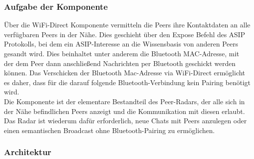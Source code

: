 \subsubsection{Aufgabe der Komponente}
Über die WiFi-Direct Komponente vermitteln die Peers ihre Kontaktdaten an alle ver\-füg\-ba\-ren Peers in der Nähe. Dies geschieht über den Expose Befehl des ASIP Protokolls, bei dem ein ASIP-Interesse an die Wissensbasis von anderen Peers gesandt wird. Dies beinhaltet unter anderem die Bluetooth MAC-Adresse, mit der dem Peer dann anschließend Nachrichten per Bluetooth geschickt werden können. Das Verschicken der Bluetooth Mac-Adresse via WiFi-Direct ermöglicht es daher, dass für die darauf folgende Bluetooth-Verbindung kein Pairing benötigt wird. 
\\Die Komponente ist der elementare Bestandteil des Peer-Radars, der alle sich in der Nähe befindlichen Peers anzeigt und die Kommunikation mit diesen erlaubt. Das Radar ist wiederum dafür erforderlich, neue Chats mit Peers anzulegen oder einen semantischen Broadcast ohne Bluetooth-Pairing zu ermöglichen.


\subsubsection{Architektur}

\label{ch:wifioverview}

